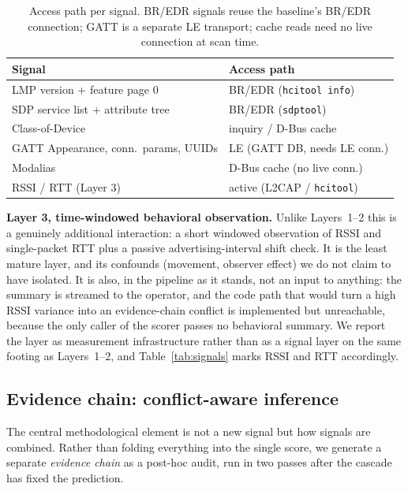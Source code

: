 \documentclass[conference]{IEEEtran}
\begin{document}
\begin{table}[h]
\centering
\footnotesize
\renewcommand{\arraystretch}{1.15}
\caption{Access path per signal. BR/EDR signals reuse the baseline's
BR/EDR connection; GATT is a separate LE transport; cache reads need no
live connection at scan time.}
\label{tab:transport}
\begin{tabular}{@{}ll@{}}
\toprule
\textbf{Signal} & \textbf{Access path} \\
\midrule
LMP version + feature page 0 & BR/EDR (\texttt{hcitool info}) \\
SDP service list + attribute tree & BR/EDR (\texttt{sdptool}) \\
Class-of-Device & inquiry / D-Bus cache \\
GATT Appearance, conn.\ params, UUIDs & LE (GATT DB, needs LE conn.) \\
Modalias & D-Bus cache (no live conn.) \\
RSSI / RTT (Layer 3) & active (L2CAP / \texttt{hcitool}) \\
\bottomrule
\end{tabular}
\end{table}

\textbf{Layer 3, time-windowed behavioral observation.}
Unlike Layers~1--2 this is a genuinely additional interaction: a short
windowed observation of RSSI and single-packet RTT plus a passive
advertising-interval shift check. It is the least mature layer, and its
confounds (movement, observer effect) we do not claim to have isolated.
It is also, in the pipeline as it stands, not an input to anything: the
summary is streamed to the operator, and the code path that would turn a
high RSSI variance into an evidence-chain conflict is implemented but
unreachable, because the only caller of the scorer passes no behavioral
summary. We report the layer as measurement infrastructure rather than as a
signal layer on the same footing as Layers~1--2, and Table~\ref{tab:signals}
marks RSSI and RTT accordingly.

\subsection{Evidence chain: conflict-aware inference}\label{sec:evidence}
The central methodological element is not a new signal but how signals are
combined. Rather than folding everything into the single score, we generate a
separate \emph{evidence chain} as a post-hoc audit, run in two passes after
the cascade has fixed the prediction.
\end{document}

